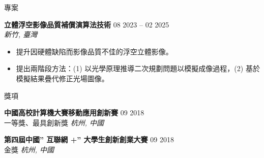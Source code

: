 \documentclass{resume}
\begin{document}
\begin{rSection}{專案}
    \item \textbf{立體浮空影像品質補償演算法技術} \hfill {08 2023 -- 02 2025}\\
    \mbox{} \hfill \textit{新竹, 臺灣}
    \vspace{-0.5em}
    \begin{itemize}
        \item 提升因硬體缺陷而影像品質不佳的浮空立體影像。
        \item 提出兩階段方法：(1) 以光學原理推導二次規劃問題以模擬成像過程，(2) 基於模擬結果疊代修正光場圖像。
    \end{itemize}
\end{rSection} 

\vspace{-1em}
\begin{rSection}{獎項}
\vspace{-1.25em}
    \item \textbf{中國高校計算機大賽移動應用創新賽} \hfill {09 2018}\\
    {一等獎、最具創新獎} \hfill \textit{杭州, 中國}

    \item \textbf{第四屆中國” 互聯網 +” 大學生創新創業大賽} \hfill {09 2018}\\
    {金獎} \hfill \textit{杭州, 中國}

\end{rSection} 


\end{document}
